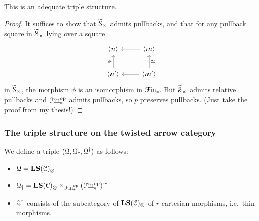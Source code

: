 \documentclass[main.tex]{subfiles}
\begin{document}
\begin{proposition}
  This is an adequate triple structure.
\end{proposition}
\begin{proof}
  It suffices to show that $\widetilde{\mathcal{S}}_{\times}$ admits pullbacks, and that for any pullback square in $\widetilde{\mathcal{S}}_{\times}$ lying over a square
  \begin{equation*}
    \begin{tikzcd}
      \langle n \rangle
      & \langle m \rangle
      \arrow[l]
      \\
      \langle n' \rangle
      \arrow[u, "\phi"]
      & \langle m' \rangle
      \arrow[l]
      \arrow[u, swap, "\simeq"]
    \end{tikzcd}
  \end{equation*}
  in $\widetilde{\mathcal{S}}_{\times}$, the morphism $\phi$ is an isomorphism in $\mathcal{F}\mathrm{in}_{*}$. But $\widetilde{\mathcal{S}}_{\times}$ admits relative pullbacks and $\mathcal{F}\mathrm{in}_{*}^{\mathrm{op}}$ admits pullbacks, so $p$ preserves pullbacks. (Just take the proof from my thesis!)
\end{proof}

\subsubsection{The triple structure on the twisted arrow category}
\label{sss:the_triple_structure_on_the_twisted_arrow_category}

We define a triple $(\mathcal{Q}, \mathcal{Q}_{\dagger}, \mathcal{Q}^{\dagger})$ as follows:
\begin{itemize}
  \item $\mathcal{Q} = \mathbf{LS}(\mathcal{C})_{\otimes}$

  \item $\mathcal{Q}_{\dagger} = \mathbf{LS}(\mathcal{C})_{\otimes} \times_{\mathcal{F}\mathrm{in}_{*}^{\mathrm{op}}}(\mathcal{F}\mathrm{in}_{*}^{\mathrm{op}})^{\simeq}$

  \item $\mathcal{Q}^{\dagger}$ consists of the subcategory of $\mathbf{LS}(\mathcal{C})_{\otimes}$ of $r$-cartesian morphisms, i.e.\ thin morphisms.
\end{itemize}
\end{document}
